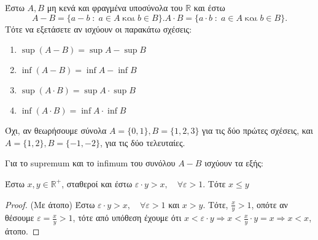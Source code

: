 \begin{exercise}
  Έστω $ A,B $ μη κενά και φραγμένα υποσύνολα του $ \mathbb{R} $ και έστω 
  \[
    A-B= \{ a-b \; : \; a \in A \; \text{και} \; b \in B \} . 
    A\cdot B= \{ a\cdot b \; : \; a \in A \; \text{και} \; b \in B \} . 
  \]
  Τότε να εξετάσετε αν ισχύουν οι παρακάτω σχέσεις:
  \begin{enumerate}
    \item $ \sup {(A-B)}= \sup A - \sup B $
    \item $ \inf {(A-B)}= \inf A - \inf B $
    \item $ \sup {(A\cdot B)}= \sup A \cdot  \sup B $
    \item $ \inf {(A\cdot B)}= \inf A \cdot  \inf B $
  \end{enumerate}
\end{exercise}
\begin{solution}
  Όχι, αν θεωρήσουμε σύνολα $ A = \{ 0,1 \} , B = \{ 1,2,3 \} $ για τις 
  δύο πρώτες σχέσεις, και $ A = \{ 1,2 \} , B = \{ -1,-2 \} $, για τις δύο 
  τελευταίες.
\end{solution}

\begin{rem}
  Για το supremum και το infimum του συνόλου $ A-B $ ισχύουν τα εξής:

\end{rem}

\begin{lem}
  \label{lem:vare3}
  Έστω $ x,y \in \mathbb{R}^{+} $, σταθεροί και έστω $ \varepsilon \cdot y >x, \quad 
  \forall \varepsilon >1$. Τότε $ x \leq y $
\end{lem}
\begin{proof}(Με άτοπο)
  Έστω $ \varepsilon \cdot y > x, \quad \forall \varepsilon >1 $  και $ x>y $.
  Τότε, $ \frac{x}{y} > 1$, οπότε αν θέσουμε $ \varepsilon = \frac{x}{y} > 1 $,
  τότε από υπόθεση έχουμε ότι $ x < \varepsilon \cdot y \Rightarrow x <
  \frac{x}{y} \cdot y = x \Rightarrow x<x $, άτοπο.
\end{proof}

